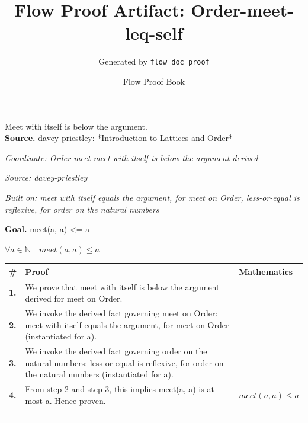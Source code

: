 \documentclass[11pt]{article}
\title{Flow Proof Artifact: Order-meet-leq-self}
\author{Generated by \texttt{flow doc proof}}
\date{Flow Proof Book}
\theoremstyle{definition}
\begin{document}
\maketitle
Meet with itself is below the argument.\\[0.5em]
\textbf{Source.} davey-priestley: *Introduction to Lattices and Order*\\[0.5em]
\bigskip
{}\par
\smallskip\noindent\textit{Coordinate: Order \cdot meet \cdot meet with itself is below the argument derived}\par
\smallskip\noindent\textit{Source: davey-priestley}\par
\smallskip\noindent\textit{Built on: meet with itself equals the argument, for meet on Order, less-or-equal is reflexive, for order on the natural numbers}\par
\medskip
\noindent\textbf{Goal.} meet(a, a) <= a\par
\noindent$\displaystyle \forall a \in \mathbb{N}\quad meet(a, a) \le a$\par
\medskip
\noindent
\begin{tabular}{@{} >{\raggedright\arraybackslash}p{} >{\raggedright\arraybackslash}p{} >{\raggedleft\arraybackslash}p{} @{}}
\textbf{\#} & \textbf{Proof} & \textbf{Mathematics} \\
\midrule
\textbf{1.} & We prove that meet with itself is below the argument derived for meet on Order. & \\[0.45em]
\textbf{2.} & We invoke the derived fact governing meet on Order: meet with itself equals the argument, for meet on Order (instantiated for a). & \\[0.45em]
\textbf{3.} & We invoke the derived fact governing order on the natural numbers: less-or-equal is reflexive, for order on the natural numbers (instantiated for a). & \\[0.45em]
\textbf{4.} & From step 2 and step 3, this implies meet(a, a) is at most a. Hence proven. & $\displaystyle meet(a, a) \le a$ \\[0.45em]
\bottomrule
\end{tabular}
\label{thm:Order-meet-meet_with_itself_is_below_the_argument_derived}
\par\medskip\hrule
\end{document}

